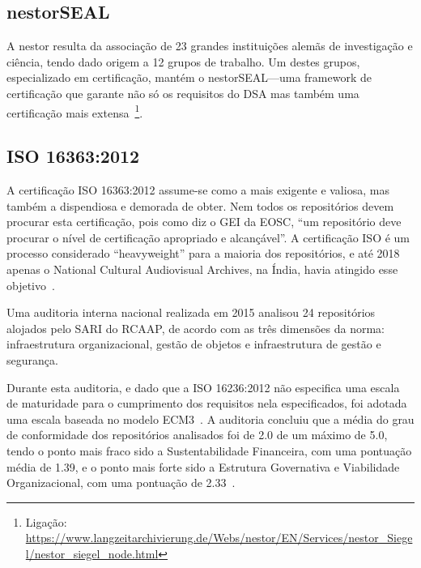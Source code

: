 \documentclass[sigconf,nonacm]{acmart}
\begin{document}

\subsection{nestorSEAL} %
\label{sub:nestorseal}

A \gls{nestor} resulta da associação de 23 grandes instituições alemãs de investigação e ciência, tendo dado origem a 12 grupos de trabalho. Um destes grupos, especializado em certificação, mantém o nestorSEAL---uma framework de certificação que garante não só os requisitos do \gls{DSA} mas também uma certificação mais extensa~\footnote{Ligação: \url{https://www.langzeitarchivierung.de/Webs/nestor/EN/Services/nestor_Siegel/nestor_siegel_node.html}}.


\subsection{ISO 16363:2012} %
\label{sub:iso_16363_2012}

A certificação \gls{ISO} 16363:2012 assume-se como a mais exigente e valiosa, mas também a dispendiosa e demorada de obter. Nem todos os repositórios devem procurar esta certificação, pois como diz o \gls{GEI} da \gls{EOSC}, ``um repositório deve procurar o nível de certificação apropriado e alcançável''\cite{hodson2018turning}. A certificação ISO é um processo considerado ``heavyweight'' para a maioria dos repositórios, e até 2018 apenas o National Cultural Audiovisual Archives, na Índia, havia atingido esse objetivo~\cite{Lindlar_Schwab_2019,IndianMinistryofCulture2017}.

Uma auditoria interna nacional realizada em 2015 analisou 24 repositórios alojados pelo \gls{SARI} do \gls{RCAAP}, de acordo com as três dimensões da norma: infraestrutura organizacional, gestão de objetos e infraestrutura de gestão e segurança.

Durante esta auditoria, e dado que a \gls{ISO} 16236:2012 não especifica uma escala de maturidade para o cumprimento dos requisitos nela especificados, foi adotada uma escala baseada no modelo ECM3~\cite{Katuu2013}. A auditoria concluiu que a média do grau de conformidade dos repositórios analisados foi de 2.0 de um máximo de 5.0, tendo o ponto mais fraco sido a Sustentabilidade Financeira, com uma pontuação média de 1.39, e o ponto mais forte sido a Estrutura Governativa e Viabilidade Organizacional, com uma pontuação de 2.33~\cite{Carvalho2014}.
\end{document}
